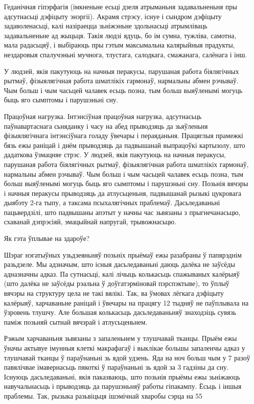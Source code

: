 Геданічная гіпэрфагія (імкненьне есьці дзеля атрыманьня задавальненьня пры адсутнасьці дэфіцыту энэргіі).
Акрамя стрэсу, існуе і сындром дэфіцыту задаволенасьці, калі назіраецца зьніжэньне здольнасьці атрымліваць задавальненьне ад жыцьця. Такія людзі ядуць, бо ім сумна, тужліва, самотна, мала радасьцяў, і выбіраюць пры гэтым максымальна калярыйныя прадукты, нездаровыя спалучэньні мучнога, тлустага, салодкага, смажанага, салёнага і інш.

У людзей, якія пакутуюць на начныя перакусы, парушаная работа біялягічных рытмаў, фізыялягічная работа шматлікіх гармонаў, нармальны абмен рэчываў. Чым больш і чым часьцей чалавек есьць позна, тым больш выяўленымі могуць быць яго сымптомы і парушэньні сну.

Працоўная нагрузка.
Інтэнсіўная працоўная нагрузка, адсутнасьць паўнавартаснага сьняданку і часу на абед прыводзяць да зьяўленьня фізыялягічнага інтэнсіўнага голаду ўвечары і пераяданьня. Працяглыя прамежкі бязь ежы раніцай і днём прыводзяць да падвышанай выпрацоўкі картызолу, што дадаткова ўзмацняе стрэс.
У людзей, якія пакутуюць на начныя перакусы, парушаная работа біялягічных рытмаў, фізыялягічная работа шматлікіх гармонаў, нармальны абмен рэчываў. Чым больш і чым часьцей чалавек есьць позна, тым больш выяўленымі могуць быць яго сымптомы і парушэньні сну. Позьнія вячэры і начныя перакусы прыводзяць да атлусьценьня, падвышанай рызыкі цукровага дыябэту 2-га тыпу, а таксама псыхалягічных праблемаў. Дасьледаваньні пацьвердзілі, што падвышаны апэтыт у начны час зьвязаны з прыгнечанасьцю, схаванай дэпрэсіяй, эмацыйнай напругай, трывожнасьцю.

Як гэта ўплывае на здароўе?

Шэраг нэгатыўных узьдзеяньняў позьніх прыёмаў ежы разабраны ў папярэднім разьдзеле. Мы адзначым, што існыя дасьледаваньні даюць далёка не заўсёды адназначны адказ. Па сутнасьці, калі лічыць колькасьць спажываных калёрыяў (што далёка не заўсёды рэальна ў доўгатэрміновай пэрспэктыве), то ўплыў вячэры на структуру цела не такі вялікі. Так, ва ўмовах лёгкага дэфіцыту калёрыяў, харчаваньне раніцай і ўвечары на працягу 12 тыдняў не паўплывала на ўзровень тлушчу. Але большая колькасьць дасьледаваньняў знаходзіць сувязь паміж позьняй сытнай вячэрай і атлусьценьнем.

Рэжым харчаваньня зьвязаны з запаленьнем у тлушчавай тканцы. Прыём ежы ўначы актывуе імунныя клеткі макрафагаў і выклікае большы запаленчы адказ у тлушчавай тканцы ў параўнаньні зь ядой удзень. Яда на ноч больш чым у 7 разоў павялічвае імавернасьць пякоткі ў параўнаньні зь ядой за 3 гадзіны да сну. Існуюць дасьледаваньні, якія паказваюць, што позьнія прыёмы ежы зьніжаюць навучальнасьць і прыводзяць да парушэньняў работы гіпакампу.
Ёсьць і іншыя праблемы. Так, рызыка разьвіцьця ішэмічнай хваробы сэрца на 55%

